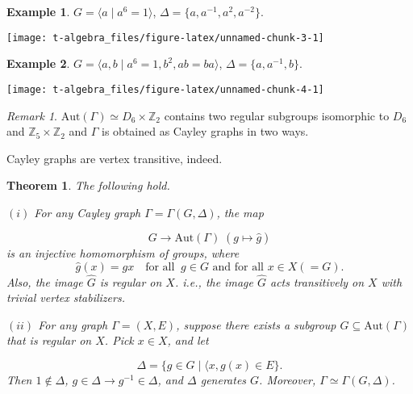 \documentclass[
]{book}
\newtheorem{theorem}{Theorem}[chapter]
\theoremstyle{definition}
\theoremstyle{definition}
\newtheorem{example}{Example}[chapter]
\theoremstyle{definition}
\theoremstyle{definition}
\theoremstyle{remark}
\newtheorem*{remark}{Remark}
\begin{document}
\begin{example}

\(G = \langle a \mid a^6 = 1\rangle\), \(\Delta = \{a, a^{-1}, a^2, a^{-2}\}\).

\begin{center}\texttt{[image: t-algebra\_files/figure-latex/unnamed-chunk-3-1]} \end{center}

\end{example}

\begin{example}

\(G = \langle a, b \mid a^6 = 1, b^2, ab = ba\rangle\), \(\Delta = \{a, a^{-1}, b\}\).

\begin{center}\texttt{[image: t-algebra\_files/figure-latex/unnamed-chunk-4-1]} \end{center}

\end{example}

\begin{remark}
\(\mathrm{Aut}(\Gamma) \simeq D_6\times \mathbb{Z}_2\) contains two regular subgroups isomorphic to \(D_6\) and \(\mathbb{Z}_5 \times \mathbb{Z}_2\) and \(\Gamma\) is obtained as Cayley graphs in two ways.
\end{remark}

Cayley graphs are vertex transitive, indeed.

\begin{theorem}
\protect\hypertarget{thm:cayley-graph}{}\label{thm:cayley-graph}The following hold.

\((i)\) For any Cayley graph \(\Gamma = \Gamma(G, \Delta)\), the map

\[G \to \mathrm{Aut}(\Gamma) \; (g\mapsto \hat{g})\]
is an injective homomorphism of groups, where
\[\hat{g}(x) = gx \quad \textrm{for all }\: g\in G \textrm{ and for all } x\in X (= G).\]
Also, the image \(\hat{G}\) is regular on \(X\). i.e., the image \(\hat{G}\) acts transitively on \(X\) with trivial vertex stabilizers.

\((ii)\) For any graph \(\Gamma = (X, E)\), suppose there exists a subgroup \(G \subseteq \mathrm{Aut}(\Gamma)\) that is regular on \(X\). Pick \(x\in X\), and let

\[\Delta = \{g\in G\mid \langle x, g(x)\in E\}.\]
Then \(1\not\in \Delta\), \(g\in \Delta \to g^{-1}\in \Delta\), and \(\Delta\) generates \(G\). Moreover, \(\Gamma \simeq \Gamma(G, \Delta)\).
\end{theorem}
\end{document}
